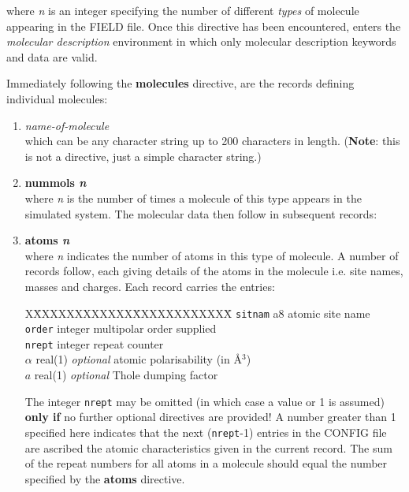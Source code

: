 
\noindent where {\em n} is an integer specifying the number of
different {\em types} of molecule appearing in the FIELD file.
Once this directive has been encountered, \D enters the {\em
molecular description} environment in which only molecular
description keywords and data are valid.

Immediately following the {\bf molecules} directive, are the records
defining individual molecules:

\begin{enumerate}

\item {\em name-of-molecule} \\
which can be any character string up to 200 characters in length.
({\bf Note}: this is not a directive, just a simple character string.)

\item {\bf nummols {\em n}} \\
where {\em n} is the number of times a molecule of this type
appears in the simulated system.  The molecular data then follow
in subsequent records:

\item {\bf atoms {\em n}} \\
where {\em n} indicates the number of atoms in this type of
molecule.  A number of records follow, each giving details of the
atoms in the molecule i.e. site names, masses and charges.  Each
record carries the entries:
\begin{tabbing}
X\=XXXXXXXXXXXX\=XXXXXXXXXXXX\=\kill
\> {\tt sitnam}    \> a8      \> atomic site name \\
\> {\tt order}     \> integer \> multipolar order supplied \\
\> {\tt nrept}     \> integer \> repeat counter \\
\> {\tt $\alpha$}  \> real(1) \> {\em optional} atomic polarisability (in \AA$^{3}$) \\
\> {\tt $a$}       \> real(1) \> {\em optional} Thole dumping factor
\end{tabbing}
The integer {\tt nrept} may be omitted (in which case a value or 1
is assumed) {\bf only if} no further optional directives are provided!
A number greater than 1 specified here indicates that the next
({\tt nrept}-1) entries in the CONFIG file are ascribed the atomic
characteristics given in the current record.  The sum of the
repeat numbers for all atoms in a molecule should equal the number
specified by the {\bf atoms} directive.


\end{enumerate}
